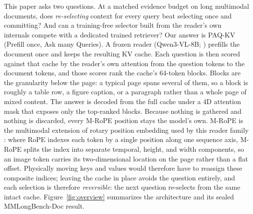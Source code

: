 \documentclass[letterpaper]{article} %
\newcommand{\paqc}{\textsc{PAQ-KV}}
\begin{document}
This paper asks two questions. At a matched evidence budget on long multimodal
documents, does \emph{re-selecting} context for every query beat selecting once
and committing? And can a training-free selector built from the reader's own
internals compete with a dedicated trained retriever? Our answer is \paqc{}
(Prefill once, Ask many Queries). A frozen reader (Qwen3-VL-8B;
\citealp{qwen3vl2025}) prefills the document once and keeps the resulting KV
cache. Each question is then scored against that cache by the reader's own
attention from the question tokens to the document tokens, and those scores rank
the cache's 64-token blocks. Blocks are the granularity below the page: a
typical page spans several of them, so a block is roughly a table row, a figure
caption, or a paragraph rather than a whole page of mixed content. The answer is
decoded from the full cache under a 4D attention mask that exposes only the
top-ranked blocks. Because nothing is gathered and nothing is discarded, every
M-RoPE position stays the model's own. M-RoPE is the multimodal extension of
rotary position embedding used by this reader family \citep{bai2025qwen25vl}:
where RoPE indexes each token by a single position along one sequence axis,
M-RoPE splits the index into separate temporal, height, and width components, so
an image token carries its two-dimensional location on the page rather than a
flat offset. Physically moving keys and values would therefore have to reassign
these composite indices; leaving the cache in place avoids the question
entirely, and each selection is therefore \emph{reversible}: the next question
re-selects from the same intact cache. Figure~\ref{fig:overview} summarizes the
architecture and its sealed MMLongBench-Doc result.
\end{document}
